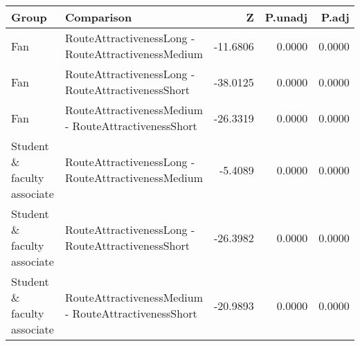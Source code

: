 \begin{tabular}{llrrr}
  \hline
Group & Comparison & Z & P.unadj & P.adj \\ 
  \hline
Fan & RouteAttractivenessLong - RouteAttractivenessMedium & -11.6806 & 0.0000 & 0.0000 \\ 
  Fan & RouteAttractivenessLong - RouteAttractivenessShort & -38.0125 & 0.0000 & 0.0000 \\ 
  Fan & RouteAttractivenessMedium - RouteAttractivenessShort & -26.3319 & 0.0000 & 0.0000 \\ 
  Student \& faculty associate & RouteAttractivenessLong - RouteAttractivenessMedium & -5.4089 & 0.0000 & 0.0000 \\ 
  Student \& faculty associate & RouteAttractivenessLong - RouteAttractivenessShort & -26.3982 & 0.0000 & 0.0000 \\ 
  Student \& faculty associate & RouteAttractivenessMedium - RouteAttractivenessShort & -20.9893 & 0.0000 & 0.0000 \\ 
   \hline
\end{tabular}
